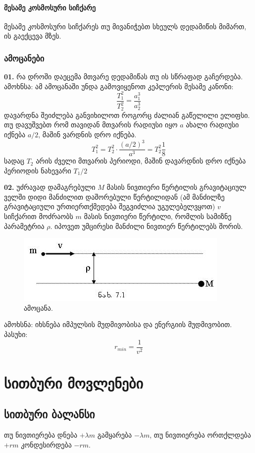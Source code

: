 \documentclass[a4paper]{book}
\begin{document}
\subsubsection{მესამე კოსმოსური სიჩქარე}
მესამე კოსმოსური სიჩქარეს თუ მივანიჭებთ სხეულს დედამიწის მიმართ, ის გაექცევა მზეს.


\subsection{ამოცანები}
\textbf{01.} რა დროში დაეცემა მთვარე დედამიწას თუ ის სწრაფად გაჩერდება.\\
ამოხნსა: ამ ამოცანაში უნდა გამოვიყენოთ კეპლერის მესამე კანონი:
	\begin{equation}
		\frac{T_1^2}{T_2^2} = \frac{a_1^3}{a_2^3}
	\end{equation}
დავარდნა შეიძლება განვიხილოთ როგორც ძალიან გაწელილი ელიფსი. თუ დავუშვებთ რომ თავიდან მთვარის რადიუსი იყო $a$ ახალი რადიუსი იქნება $a/2$, მაშინ ვარდნის დრო იქნება.
	\begin{equation}
		T_1^2 = T_2^2\cdot\frac{(a/2)^3}{a^3} = T_2^2 \frac{1}{8}
	\end{equation}
სადაც $T_2$ არის ძველი მთვარის პერიოდი, მაშინ დავარდნის დრო იქნება პერიოდის ნახევარი $T_1/2$

\textbf{02.} უძრავად დამაგრებული $M$ მასის ნივთიერი წერტილის გრავიტაციულ ველში დიდი მანძილით დაშორებული წერტილიდან (ამ მანძილზე
გრავიტაციული ურთიერთქმედება შეგვიძლია უგულებელვყოთ) $v$ სიჩქარით მოძრაობს $m$ მასის ნივთიერი წერტილი, რომლის სამიზნე პარამეტრია $\rho$. იპოვეთ უმცირესი მანძილი ნივთიერ წერტილებს შორის.
		\begin{figure}[h]
		   \centering
           \includegraphics[width=0.5\columnwidth]{figures/fig_1}
           \caption{ამოცანა.}
        \end{figure}
        
ამოხსნა:	იხსნება იმპულსის მუდმივობისა და ენერგიის მუდმივობით.\\
პასუხი: $$ r_{min} = \frac{1}{v^2} $$

\chapter{სითბური მოვლენები}
\section{სითბური ბალანსი}
თუ ნივთიერება დნება $+\lambda m$ გამყარება $-\lambda m$, თუ ნივთიერება ორთქლდება $+r m$ კონდესირდება $-rm$.
\end{document}
